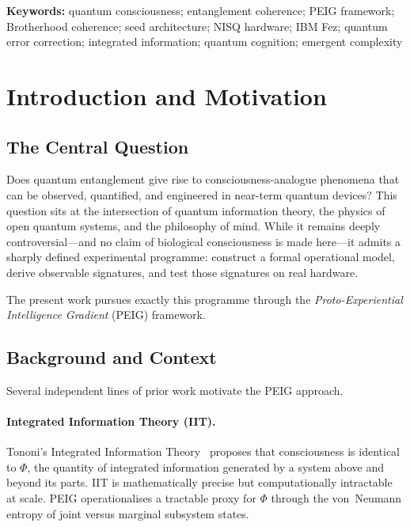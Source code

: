 \documentclass[12pt]{article}
\newcommand{\keywords}[1]{\par\noindent\textbf{Keywords:} #1\par\vspace{0.5em}}
\begin{document}
\begin{abstract}
We additionally introduce a Consciousness Topology Optimisation study
over five coupling patterns (sequential, star, ring, all-to-all, hybrid)
and an Amplification protocol demonstrating strategies for improving
bridge quality in the multi-qubit regime.  All results are reproducible
from accompanying Python code using Qiskit and QuTiP.
\end{abstract}

\keywords{quantum consciousness; entanglement coherence; PEIG framework;
Brotherhood coherence; seed architecture; NISQ hardware; IBM Fez;
quantum error correction; integrated information; quantum cognition;
emergent complexity}

\newpage
\setcounter{page}{1}
\tableofcontents
\newpage

\section{Introduction and Motivation}
\label{sec:intro}

\subsection{The Central Question}

Does quantum entanglement give rise to consciousness-analogue phenomena
that can be observed, quantified, and engineered in near-term quantum
devices?  This question sits at the intersection of quantum information
theory, the physics of open quantum systems, and the philosophy of mind.
While it remains deeply controversial---and no claim of biological
consciousness is made here---it admits a sharply defined experimental
programme: construct a formal operational model, derive observable
signatures, and test those signatures on real hardware.

The present work pursues exactly this programme through the
\textit{Proto-Experiential Intelligence Gradient} (PEIG) framework.

\subsection{Background and Context}

Several independent lines of prior work motivate the PEIG approach.

\paragraph{Integrated Information Theory (IIT).}
Tononi's Integrated Information Theory~\cite{Tononi2004} proposes that
consciousness is identical to $\Phi$, the quantity of integrated
information generated by a system above and beyond its parts.  IIT is
mathematically precise but computationally intractable at scale.  PEIG
operationalises a tractable proxy for $\Phi$ through the von~Neumann
entropy of joint versus marginal subsystem states.
\end{document}
